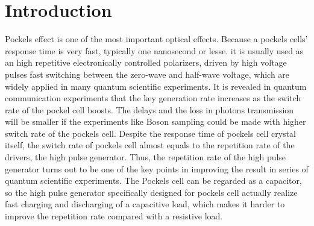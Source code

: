 \documentclass[aip,rsi,reprint,graphicx]{revtex4-1} %
\begin{document}
\pacs{}%

\maketitle %


\section{Introduction}
Pockels effect is one of the most important optical effects. Because a pockels cells' response time is very fast, typically one nanosecond or lesse\cite{Johnson1977Optical}. it is usually used as an high repetitive electronically controlled polarizers, driven by high voltage pulses fast switching between the zero-wave and half-wave voltage, which are widely applied in many quantum scientific experiments\cite{Yin2017Satellite}.
It is revealed in quantum communication experiments that the key generation rate increases as the switch rate of the pockel cell boosts\cite{Li2016RRdps}. The delays and the loss in photons transmission will be smaller if the experiments like Boson sampling\cite{Li2017Boson} could be made with higher switch rate of the pockels cell.
Despite the response time of pockels cell crystal itself, the switch rate of pockels cell almost equals to the repetition rate of the drivers, the high pulse generator.
Thus, the repetition rate of the high pulse generator turns out to be one of the key points in improving the result in series of quantum scientific experiments.
The Pockels cell can be regarded as a capacitor, so the high pulse generator specifically designed for pockels cell actually realize fast charging and discharging of a capacitive load, which makes it harder to improve the repetition rate compared with a resistive load.
\end{document}
